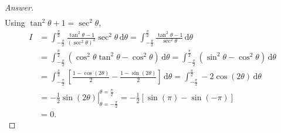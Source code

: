\documentclass[12pt]{article}
\newcommand\paren[1]{\left( #1 \right)}
\newcommand{\sqbrack}[1]{\left [ #1 \right ]}
\theoremstyle{definition}
\begin{document}
\begin{proof}[Answer]
\begin{align*}
    \end{align*}
    Using $\tan^2 \theta + 1 = \sec^2 \theta$, 
    \begin{align*}
        I & = \int_{-\frac{\pi}{2}}^{\frac{\pi}{2}} \frac{ \tan^2 \theta - 1 }{ \paren{ \sec^2 \theta }^2 } \sec^2 \theta \, \mathrm{d} \theta = \int_{-\frac{\pi}{2}}^{\frac{\pi}{2}} \frac{ \tan^2 \theta - 1 }{ \sec^2 \theta } \, \mathrm{d}\theta \\
        & = \int_{-\frac{\pi}{2}}^{\frac{\pi}{2}} \paren{ \cos^2 \theta \tan^2 \theta - \cos^2 \theta } \, \mathrm{d}\theta = \int_{-\frac{\pi}{2}}^{\frac{\pi}{2}} \paren{ \sin^2 \theta - \cos^2 \theta } \, \mathrm{d}\theta \\
        & = \int_{-\frac{\pi}{2}}^{\frac{\pi}{2}} \sqbrack{ \frac{1 - \cos(2\theta)}{2} - \frac{1 - \sin(2\theta)}{2} } \, \mathrm{d}\theta = \int_{-\frac{\pi}{2}}^{\frac{\pi}{2}} -2 \cos(2\theta) \, \mathrm{d}\theta \\
        & = \left. -\frac{1}{2} \sin(2\theta) \right|_{\theta = -\frac{\pi}{2}}^{\theta = \frac{\pi}{2}} = -\frac{1}{2} \sqbrack{ \sin(\pi) - \sin(-\pi) } \\
        & = \boxed{ 0. }
    \end{align*}
\end{proof}
\end{document}
